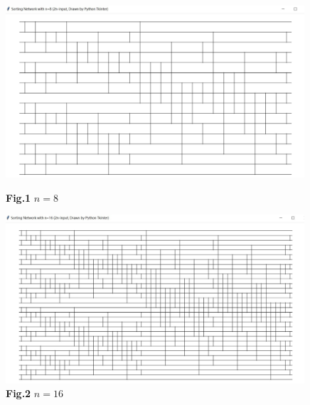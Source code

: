 \documentclass[12pt,a4paper,UTF8]{article}
\theoremstyle{definition}
\begin{document}
\begin{enumerate}
\begin{enumerate}
    	\begin{figure}[htbp]
    		\begin{minipage}[h]{0.48\textwidth}
    			\centering
    			\includegraphics[width=0.99\textwidth]{8.pdf}
    			\caption*{\textbf{Fig.1} $n = 8$} \label{Fig-8}
    		\end{minipage}
    		\hspace{5mm}
    		\begin{minipage}[h]{0.52\textwidth}
    			\centering
    			\includegraphics[width=0.99\textwidth]{16.pdf}
    			\caption*{\textbf{Fig.2} $n = 16$} \label{Fig-16}
    		\end{minipage}
    	\end{figure}
    

\end{enumerate}
\end{enumerate}
\end{document}
